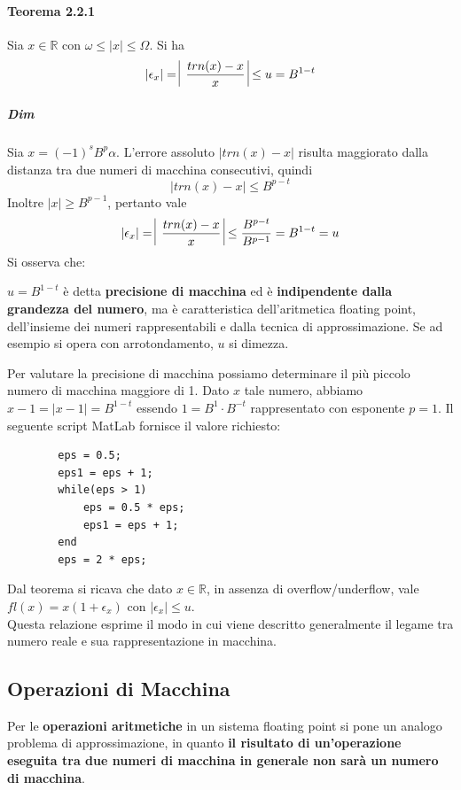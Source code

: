 \documentclass[10pt]{book}
\begin{document}
\paragraph{Teorema 2.2.1} Sia $x \in \mathbb{R}$ con $\omega \leq |x| \leq \Omega$. Si ha $$|\epsilon_x| = \:\vline\:\frac{trn(x) - x}{x}\:\vline \leq u = B^{1-t}$$
\subparagraph{Dim} Sia $x = (-1)^sB^p\alpha$. L'errore assoluto $|trn(x) - x|$ risulta maggiorato dalla distanza tra due numeri di macchina consecutivi, quindi $$|trn(x) - x|\leq B^{p-t}$$ Inoltre $|x| \geq B^{p-1}$, pertanto vale $$|\epsilon_x| = \:\vline\:\frac{trn(x) - x}{x}\:\vline \leq \frac{B^{p-t}}{B^{p-1}} = B^{1-t} = u$$
Si osserva che:
\begin{list}{}{}
	\item $u = B^{1-t}$ è detta \textbf{precisione di macchina} ed è \textbf{indipendente dalla grandezza del numero}, ma è caratteristica dell'aritmetica floating point, dell'insieme dei numeri rappresentabili e dalla tecnica di approssimazione. Se ad esempio si opera con arrotondamento, $u$ si dimezza.
	\item Per valutare la precisione di macchina possiamo determinare il più piccolo numero di macchina maggiore di 1. Dato $x$ tale numero, abbiamo $x - 1 = |x - 1| = B^{1-t}$ essendo $1 = B^1 \cdot B^{-t}$ rappresentato con esponente $p = 1$. Il seguente script MatLab fornisce il valore richiesto:
	\begin{lstlisting}
		eps = 0.5;
		eps1 = eps + 1;
		while(eps > 1)
			eps = 0.5 * eps;
			eps1 = eps + 1;
		end
		eps = 2 * eps;
	\end{lstlisting}
	\item Dal teorema si ricava che dato $x \in \mathbb{R}$, in assenza di overflow/underflow, vale $fl(x) = x(1 + \epsilon_x)$ con $|\epsilon_x| \leq u$.\\
	Questa relazione esprime il modo in cui viene descritto generalmente il legame tra numero reale e sua rappresentazione in macchina.
\end{list}
\subsection{Operazioni di Macchina}
Per le \textbf{operazioni aritmetiche} in un sistema floating point si pone un analogo problema di approssimazione, in quanto \textbf{il risultato di un'operazione eseguita tra due numeri di macchina in generale non sarà un numero di macchina}.
\end{document}
